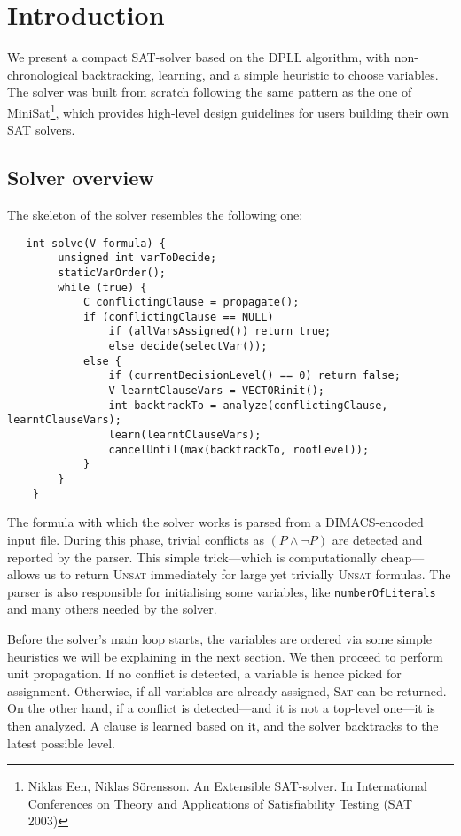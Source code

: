 


  
\section{Introduction}  
We present a compact SAT-solver based on the DPLL algorithm, with non-chronological backtracking, learning, and a simple heuristic to choose variables. The solver was built from scratch following the same pattern as the one of MiniSat\footnote{Niklas Een, Niklas Sörensson. An Extensible SAT-solver. In International Conferences on Theory and Applications of Satisfiability Testing (SAT 2003)}, which provides high-level design guidelines for users building their own SAT solvers.
  
  \subsection{Solver overview}
   The skeleton of the solver resembles the following one: \\
   \begin{lstlisting}
   int solve(V formula) {
   		unsigned int varToDecide;
    	staticVarOrder();
    	while (true) {
        	C conflictingClause = propagate();
        	if (conflictingClause == NULL)
            	if (allVarsAssigned()) return true; 
                else decide(selectVar());	
        	else {
            	if (currentDecisionLevel() == 0) return false;
            	V learntClauseVars = VECTORinit();
            	int backtrackTo = analyze(conflictingClause, learntClauseVars);
            	learn(learntClauseVars);
            	cancelUntil(max(backtrackTo, rootLevel));
        	}
    	}
	}
	\end{lstlisting}
    
The formula with which the solver works is parsed from a DIMACS-encoded input file. During this phase, trivial conflicts as $(P \wedge \neg{P})$  are detected and reported by the parser. This simple trick---which is computationally cheap---allows us to return \textsc{Unsat} immediately for large yet trivially \textsc{Unsat} formulas. The parser is also responsible for initialising some variables, like \texttt{numberOfLiterals} and many others needed by the solver.
    
Before the solver's main loop starts, the variables are ordered via some simple heuristics we will be explaining in the next section. We then proceed to perform unit propagation. If no conflict is detected, a variable is hence picked for assignment. Otherwise, if all variables are already assigned, \textsc{Sat} can be returned. On the other hand, if a conflict is detected---and it is not a top-level one---it is then analyzed. A clause is learned based on it, and the solver backtracks to the latest possible level.
    
